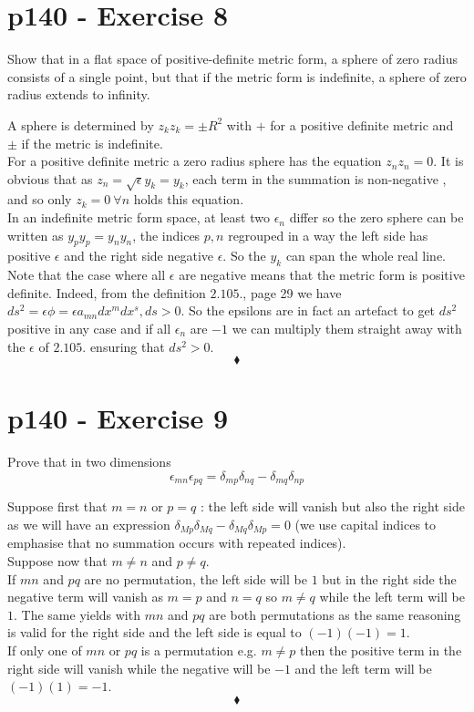 \section{p140 - Exercise 8}
\begin{tcolorbox}
Show that in a flat space of positive-definite metric form, a sphere of zero radius consists of a single point, but that if the metric form is indefinite, a sphere of zero radius extends to infinity.
\end{tcolorbox}
A sphere is determined by $ z_kz_k= \pm R^2$ with $+$ for a positive definite metric and $\pm$ if the metric is indefinite.\\
For a positive definite metric a zero radius sphere has the equation $ z_n z_n= 0$. It is obvious that as $z_n= \sqrt{\epsilon}y_k = y_k$, each term in the summation is non-negative , and so only $z_k=0 \ \forall n$ holds this equation.\\
In an indefinite metric form space, at least two $\epsilon_n$ differ so the zero sphere can be written as $y_py_p=y_ny_n$, the indices $p, n$ regrouped in a way the left side has positive $\epsilon$ and the right side negative $\epsilon$. So the $y_k$ can span the whole real line.\\
Note that the case where all $\epsilon$ are negative means that  the metric form is positive definite. Indeed, from the definition $\mathbf{2.105.}$, page 29   we have $ds^2= \epsilon \phi =\epsilon a_{mn}dx^m dx^s, ds >0$. So the epsilons are in fact an artefact to get $ds^2$ positive in any case and if all $\epsilon_n$ are $-1$ we can multiply them straight away with the $\epsilon$ of $\mathbf{2.105.}$ ensuring that $ds^2 >0$. 
$$\blacklozenge$$
\newpage

\section{p140 - Exercise 9}
\begin{tcolorbox}
Prove that in two dimensions
$$\epsilon_{mn}\epsilon_{pq}= \delta_{mp}\delta_{nq}-\delta_{mq}\delta_{np}$$
\end{tcolorbox}
Suppose first  that $m=n$ or $p=q$ : the left side will vanish but also the right side as we will have an expression $\delta_{Mp}\delta_{Mq}-\delta_{Mq}\delta_{Mp}  = 0$ (we use capital indices to emphasise that no summation occurs with repeated indices).\\
Suppose now that $m\ne n$ and $p\ne q$.\\
 If $mn$ and $pq$ are no permutation, the left side will be $1$ but in the right side the negative term will vanish as $m=p$ and $n=q$ so $ m\ne q$ while the left term will be $1$. The same yields with $mn$ and $pq$ are both  permutations as the same reasoning is valid for the right side and the left side is equal to $(-1)(-1)=1$.\\
 If only one of $mn$ or $pq$ is a  permutation  e.g. $m\ne p$ then the positive term in the right side will vanish while the negative will be $-1$ and the left term will be $(-1)(1)=-1$.
$$\blacklozenge$$
\newpage

